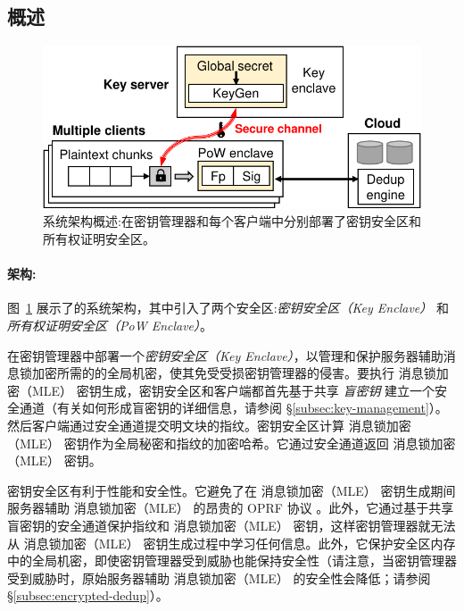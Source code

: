 \subsection{概述}
\label{subsec:arch}

\begin{figure}[t]
\centering
\includegraphics[width=\textwidth]{pic/sgxdedup/overview.pdf}
\caption{\sysnameS 系统架构概述:\sysnameS 在密钥管理器和每个客户端中分别部署了密钥安全区和所有权证明安全区。}
\label{fig:overview}
\vspace{-3pt}
\end{figure}

\paragraph{架构:} 图~\ref{fig:overview} 展示了\sysnameS 的系统架构，其中引入了两个安全区:\textit{密钥安全区（Key Enclave）} 和 \textit{所有权证明安全区（PoW Enclave）}。 

\sysnameS 在密钥管理器中部署一个\textit{密钥安全区（Key Enclave）}，以管理和保护服务器辅助消息锁加密所需的的全局机密，使其免受受损密钥管理器的侵害。要执行 消息锁加密（MLE） 密钥生成，密钥安全区和客户端都首先基于共享 \textit{盲密钥} 建立一个安全通道（有关如何形成盲密钥的详细信息，请参阅 \S\ref{subsec:key-management}）。然后客户端通过安全通道提交明文块的指纹。密钥安全区计算 消息锁加密（MLE） 密钥作为全局秘密和指纹的加密哈希。它通过安全通道返回 消息锁加密（MLE） 密钥。

密钥安全区有利于性能和安全性。它避免了在 消息锁加密（MLE） 密钥生成期间服务器辅助 消息锁加密（MLE） 的昂贵的 OPRF 协议 \cite{bellare13b}。此外，它通过基于共享盲密钥的安全通道保护指纹和 消息锁加密（MLE） 密钥，这样密钥管理器就无法从 消息锁加密（MLE） 密钥生成过程中学习任何信息。此外，它保护安全区内存中的全局机密，即使密钥管理器受到威胁也能保持安全性（请注意，当密钥管理器受到威胁时，原始服务器辅助 消息锁加密（MLE） 的安全性会降低；请参阅 \S\ref{subsec:encrypted-dedup}）。

